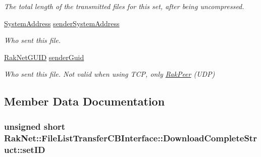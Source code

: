 \begin{DoxyCompactItemize}
\begin{DoxyCompactList}\small\item\em The total length of the transmitted files for this set, after being uncompressed. \end{DoxyCompactList}\item 
\hypertarget{struct_rak_net_1_1_file_list_transfer_c_b_interface_1_1_download_complete_struct_ac6508359314f2e0e8e5c4b14590950db}{\hyperlink{struct_rak_net_1_1_system_address}{System\-Address} \hyperlink{struct_rak_net_1_1_file_list_transfer_c_b_interface_1_1_download_complete_struct_ac6508359314f2e0e8e5c4b14590950db}{sender\-System\-Address}}\label{struct_rak_net_1_1_file_list_transfer_c_b_interface_1_1_download_complete_struct_ac6508359314f2e0e8e5c4b14590950db}

\begin{DoxyCompactList}\small\item\em Who sent this file. \end{DoxyCompactList}\item 
\hypertarget{struct_rak_net_1_1_file_list_transfer_c_b_interface_1_1_download_complete_struct_aa11e20f6cb2f0332f5bb3f8a2b78d33b}{\hyperlink{struct_rak_net_1_1_rak_net_g_u_i_d}{Rak\-Net\-G\-U\-I\-D} \hyperlink{struct_rak_net_1_1_file_list_transfer_c_b_interface_1_1_download_complete_struct_aa11e20f6cb2f0332f5bb3f8a2b78d33b}{sender\-Guid}}\label{struct_rak_net_1_1_file_list_transfer_c_b_interface_1_1_download_complete_struct_aa11e20f6cb2f0332f5bb3f8a2b78d33b}

\begin{DoxyCompactList}\small\item\em Who sent this file. Not valid when using T\-C\-P, only \hyperlink{class_rak_net_1_1_rak_peer}{Rak\-Peer} (U\-D\-P) \end{DoxyCompactList}\end{DoxyCompactItemize}


\subsection{Member Data Documentation}
\hypertarget{struct_rak_net_1_1_file_list_transfer_c_b_interface_1_1_download_complete_struct_a7f2f79cccc8890a5b17845384a58b548}{
\subsubsection[{set\-I\-D}]{\setlength{\rightskip}{0pt plus 5cm}unsigned short Rak\-Net\-::\-File\-List\-Transfer\-C\-B\-Interface\-::\-Download\-Complete\-Struct\-::set\-I\-D}}\label{struct_rak_net_1_1_file_list_transfer_c_b_interface_1_1_download_complete_struct_a7f2f79cccc8890a5b17845384a58b548}


